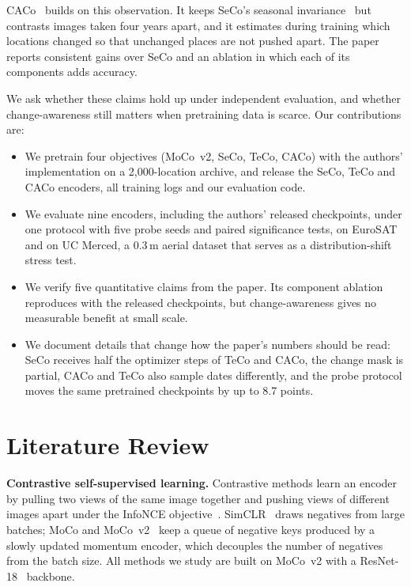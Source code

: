 \documentclass[conference]{IEEEtran}
\begin{document}
CACo~\cite{mall2023caco} builds on this observation. It keeps SeCo's seasonal
invariance~\cite{manas2021seco} but contrasts images taken four years apart,
and it estimates during training which locations changed so that unchanged
places are not pushed apart. The paper reports consistent gains over SeCo and
an ablation in which each of its components adds accuracy.

We ask whether these claims hold up under independent evaluation, and whether
change-awareness still matters when pretraining data is scarce. Our
contributions are:
\begin{itemize}
\item We pretrain four objectives (MoCo~v2, SeCo, TeCo, CACo) with the authors'
implementation on a 2,000-location archive, and release the SeCo, TeCo and CACo
encoders, all training logs and our evaluation code.
\item We evaluate nine encoders, including the authors' released checkpoints,
under one protocol with five probe seeds and paired significance tests, on
EuroSAT and on UC Merced, a 0.3\,m aerial dataset that serves as a
distribution-shift stress test.
\item We verify five quantitative claims from the paper. Its component ablation
reproduces with the released checkpoints, but change-awareness gives no
measurable benefit at small scale.
\item We document details that change how the paper's numbers should be read:
SeCo receives half the optimizer steps of TeCo and CACo, the change mask is
partial, CACo and TeCo also sample dates differently, and the probe protocol
moves the same pretrained checkpoints by up to 8.7 points.
\end{itemize}

\section{Literature Review}
\textbf{Contrastive self-supervised learning.} Contrastive methods learn an
encoder by pulling two views of the same image together and pushing views of
different images apart under the InfoNCE objective~\cite{oord2018cpc}.
SimCLR~\cite{chen2020simclr} draws negatives from large batches; MoCo and
MoCo~v2~\cite{he2020moco,chen2020mocov2} keep a queue of negative keys produced
by a slowly updated momentum encoder, which decouples the number of negatives
from the batch size. All methods we study are built on MoCo~v2 with a
ResNet-18~\cite{he2016resnet} backbone.
\end{document}
